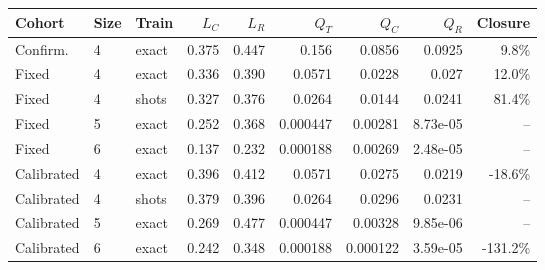 \begin{tabular}{lllrrrrrr}
\toprule
Cohort & Size & Train & $L_C$ & $L_R$ & $Q_T$ & $Q_C$ & $Q_R$ & Closure\\
\midrule
Confirm. & 4 & exact & 0.375 & 0.447 & 0.156 & 0.0856 & 0.0925 & 9.8\%\\
Fixed & 4 & exact & 0.336 & 0.390 & 0.0571 & 0.0228 & 0.027 & 12.0\%\\
Fixed & 4 & shots & 0.327 & 0.376 & 0.0264 & 0.0144 & 0.0241 & 81.4\%\\
Fixed & 5 & exact & 0.252 & 0.368 & 0.000447 & 0.00281 & 8.73e-05 & --\\
Fixed & 6 & exact & 0.137 & 0.232 & 0.000188 & 0.00269 & 2.48e-05 & --\\
Calibrated & 4 & exact & 0.396 & 0.412 & 0.0571 & 0.0275 & 0.0219 & -18.6\%\\
Calibrated & 4 & shots & 0.379 & 0.396 & 0.0264 & 0.0296 & 0.0231 & --\\
Calibrated & 5 & exact & 0.269 & 0.477 & 0.000447 & 0.00328 & 9.85e-06 & --\\
Calibrated & 6 & exact & 0.242 & 0.348 & 0.000188 & 0.000122 & 3.59e-05 & -131.2\%\\
\bottomrule
\end{tabular}
